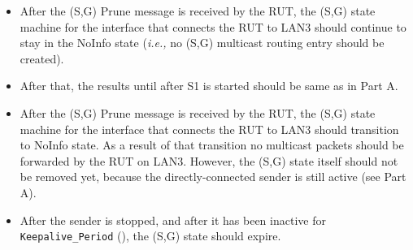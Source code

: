 \documentclass[11pt]{report}
\newcommand{\ie}{\emph{i.e.,}\xspace}
\begin{document}
\begin{itemize}

  \item After the (S,G) Prune message is received by the RUT,
  the (S,G) state machine for the interface that connects the RUT to
  LAN3 should continue to stay in the NoInfo state (\ie no (S,G) multicast
  routing entry should be created).

  \item After that, the results until after S1 is started should be same as in
  Part A.

  \item After the (S,G) Prune message is received by the RUT,
  the (S,G) state machine for the interface that connects the RUT to
  LAN3 should transition to NoInfo state.
  As a result of that transition no multicast packets should be
  forwarded by the RUT on LAN3.
  However, the (S,G) state itself should not be removed yet, because the
  directly-connected sender is still active (see Part A).

 \item After the sender is stopped, and after it has been inactive
  for \verb=Keepalive_Period= ({\PimsmKeepalivePeriod}), the (S,G) state
  should expire.

\end{itemize}

\end{document}
